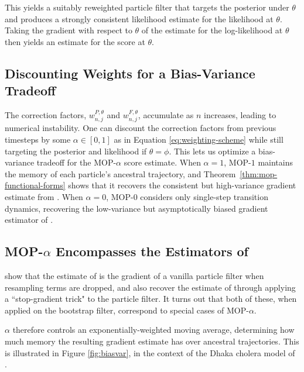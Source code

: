 \documentclass[11pt]{article}
\begin{document}
This yields a suitably reweighted particle filter that targets the posterior under $\theta$ and produces a strongly consistent likelihood estimate for the likelihood at $\theta$. Taking the gradient with respect to $\theta$ of the estimate for the log-likelihood at $\theta$ then yields an estimate for the score at $\theta$. 




\subsection{Discounting Weights for a Bias-Variance Tradeoff}

The correction factors, $w^{P,\theta}_{n,j}$ and $w^{F,\theta}_{n,j}$, accumulate as $n$ increases, leading to numerical instability.
One can discount the correction factors from previous timesteps by some $\alpha \in [0,1]$ as in Equation \ref{eq:weighting-scheme} while still targeting the posterior and likelihood if $\theta=\phi$.
This lets us optimize a bias-variance tradeoff for the MOP-$\alpha$ score estimate.
When $\alpha=1$, MOP-$1$ maintains the memory of each particle's ancestral trajectory, and Theorem~\ref{thm:mop-functional-forms} shows that it recovers the consistent but high-variance gradient estimate from \cite{poyiadjis11, scibior21}.
When $\alpha=0$, MOP-$0$ considers only single-step transition dynamics, recovering the low-variance but asymptotically biased gradient estimator of \cite{naesseth18}. 


\subsection{MOP-$\alpha$ Encompasses the Estimators of \cite{poyiadjis11, scibior21, naesseth18}}

\cite{scibior21} show that the estimate of \cite{naesseth18} is the gradient of a vanilla particle filter when resampling terms are dropped, and also recover the estimate of \cite{poyiadjis11} through applying a ``stop-gradient trick" to the particle filter. It turns out that both of these, when applied on the bootstrap filter, correspond to special cases of MOP-$\alpha$.


$\alpha$ therefore controls an exponentially-weighted moving average, determining how much memory the resulting gradient estimate has over ancestral trajectories.
This is illustrated in Figure \ref{fig:biasvar}, in the context of the Dhaka cholera model of \cite{king08}. 
\end{document}

